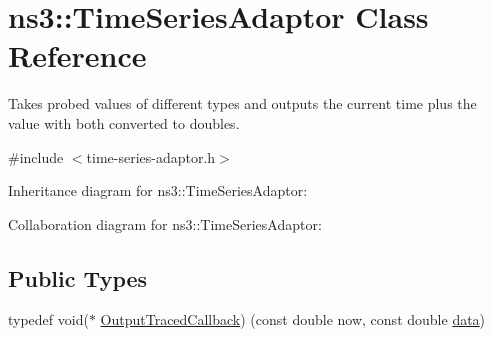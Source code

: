 \hypertarget{classns3_1_1TimeSeriesAdaptor}{}\section{ns3\+:\+:Time\+Series\+Adaptor Class Reference}
\label{classns3_1_1TimeSeriesAdaptor}


Takes probed values of different types and outputs the current time plus the value with both converted to doubles.  




{\ttfamily \#include $<$time-\/series-\/adaptor.\+h$>$}



Inheritance diagram for ns3\+:\+:Time\+Series\+Adaptor\+:


Collaboration diagram for ns3\+:\+:Time\+Series\+Adaptor\+:
\subsection*{Public Types}
\begin{DoxyCompactItemize}
\item 
typedef void($\ast$ \hyperlink{classns3_1_1TimeSeriesAdaptor_a7abe08ceb2ab1f4b965a27d1e95a6f6d}{Output\+Traced\+Callback}) (const double now, const double \hyperlink{topology-example-sim_8cc_a26c65296e316af77b787dc77469bb2a4}{data})
\end{DoxyCompactItemize}
